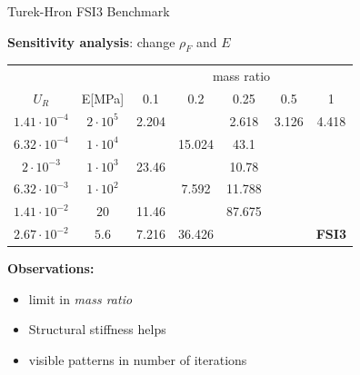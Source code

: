 \documentclass[10pt,t]{beamer}
\begin{document}
\begin{frame}{Turek-Hron FSI3 Benchmark}

\textbf{Sensitivity analysis}: change $\rho_F$ and $E$ 


\footnotesize
\begin{center}
	\begin{tabular}{ c | c | c c c c c |} 
	&  & \multicolumn{5}{c|}{mass ratio} \\
		
	$U_R$ & E[\si{MPa}] & 0.1 & 0.2 & 0.25 & 0.5 & 1 \\
	\hline
    $1.41\cdot 10^{-4}$ & $2\cdot 10^{5}$ & \cellcolor{green!10}2.204 & \cellcolor{green!10} & \cellcolor{green!10}2.618 & \cellcolor{green!10}3.126 & \cellcolor{green!10}4.418 \\
	$6.32\cdot 10^{-4}$ & $1\cdot 10^{4}$ & \cellcolor{green!10} & \cellcolor{green!10}15.024 & \cellcolor{green!10}43.1 & \cellcolor{red!10} & \cellcolor{red!10} \\        
	$2\cdot 10^{-3}$ & $1\cdot 10^{3}$ & \cellcolor{green!10}23.46 & \cellcolor{green!10} & \cellcolor{green!10}10.78 & \cellcolor{red!10} & \cellcolor{red!10} \\
	$6.32\cdot 10^{-3}$ & $1\cdot 10^{2}$ & \cellcolor{green!10} & \cellcolor{green!10}7.592 & \cellcolor{green!10}11.788 & \cellcolor{red!10} & \cellcolor{red!10} \\
	$1.41\cdot 10^{-2}$ & $20$ & \cellcolor{green!10}11.46 & \cellcolor{green!10} & \cellcolor{green!10}87.675 & \cellcolor{red!10} & \cellcolor{red!10} \\
	$2.67\cdot 10^{-2}$ & $5.6$ & \cellcolor{green!10}7.216 & \cellcolor{green!10}36.426 & \cellcolor{red!10} & \cellcolor{red!10} & \cellcolor{red!10}\textbf{FSI3} \\
	\hline                        
	\end{tabular}
\end{center}

\vspace{0.5cm}

\normalsize

\textbf{Observations:}
\begin{itemize}
    \item limit in \textit{mass ratio}
    \item Structural stiffness helps
    \item visible patterns in number of iterations
\end{itemize}


\end{frame}
\end{document}
